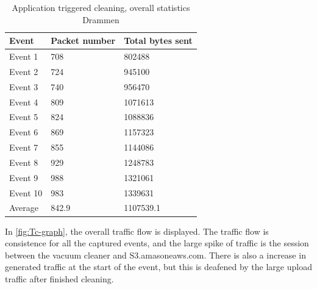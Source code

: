 \begin{table}[H]
\centering
\caption{Application triggered cleaning, overall statistics Drammen}
\label{tab:TCoverallDRA}
\begin{tabular}{|l|l|l|}
\hline
\textbf{Event} & \textbf{Packet number} & \textbf{Total bytes sent} \\ \hline
Event 1        & 708                    & 802488                    \\ \hline
Event 2        & 724                    & 945100                    \\ \hline
Event 3        & 740                    & 956470                    \\ \hline
Event 4        & 809                    & 1071613                   \\ \hline
Event 5        & 824                    & 1088836                   \\ \hline
Event 6        & 869                    & 1157323                   \\ \hline
Event 7        & 855                    & 1144086                   \\ \hline
Event 8        & 929                    & 1248783                   \\ \hline
Event 9        & 988                    & 1321061                   \\ \hline
Event 10       & 983                    & 1339631                   \\ \hline
Average        & 842.9                  & 1107539.1                 \\ \hline
\end{tabular}
\end{table}

In \ref{fig:Tc-graph}, the overall traffic flow is displayed. The traffic flow is consistence for all the captured events, and the large spike of traffic is the session between the vacuum cleaner and S3.amasoneaws.com. There is also a increase in generated traffic at the start of the event, but this is 
deafened by the large upload traffic after finished cleaning.

